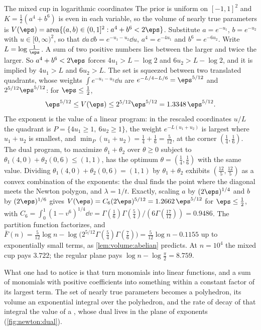 \begin{refsection}
\begin{computation}{The mixed cup in logarithmic coordinates}\label{comp:newton:emblem}
\step The prior is uniform on $[-1,1]^2$ and $K=\frac12(a^4+b^6)$ is even in each variable, so the volume of nearly true parameters is $V(\eps)=\mathrm{area}\{(a,b)\in(0,1]^2:a^4+b^6<2\eps\}$.
\step Substitute $a=e^{-u_1}$, $b=e^{-u_2}$ with $u\in[0,\infty)^2$, so that $\dd a\,\dd b=e^{-u_1-u_2}\dd u$, $a^4=e^{-4u_1}$ and $b^6=e^{-6u_2}$. Write $L=\log\frac1\eps$.
\step A sum of two positive numbers lies between the larger and twice the larger. So $a^4+b^6<2\eps$ forces $4u_1>L-\log2$ and $6u_2>L-\log2$, and it is implied by $4u_1>L$ and $6u_2>L$. The set is squeezed between two translated quadrants, whose weights $\int e^{-u_1-u_2}\dd u$ are $e^{-L/4-L/6}=\eps^{5/12}$ and $2^{5/12}\eps^{5/12}$: for $\eps\le\frac12$,
\[
\eps^{5/12}\le V(\eps)\le2^{5/12}\eps^{5/12}=1.3348\,\eps^{5/12}.
\]
\step The exponent is the value of a linear program: in the rescaled coordinates $u/L$ the quadrant is $P=\{4u_1\ge1,\ 6u_2\ge1\}$, the weight $e^{-L(u_1+u_2)}$ is largest where $u_1+u_2$ is smallest, and $\min_P(u_1+u_2)=\frac14+\frac16=\frac5{12}$, at the corner $(\frac14,\frac16)$.
\step The dual program, to maximize $\theta_1+\theta_2$ over $\theta\ge0$ subject to $\theta_1(4,0)+\theta_2(0,6)\le(1,1)$, has the optimum $\theta=(\frac14,\frac16)$ with the same value. Dividing $\theta_1(4,0)+\theta_2(0,6)=(1,1)$ by $\theta_1+\theta_2$ exhibits $(\frac{12}5,\frac{12}5)$ as a convex combination of the exponents: the dual finds the point where the diagonal meets the Newton polygon, and $\lambda=1/t$.
\step Exactly, scaling $a$ by $(2\eps)^{1/4}$ and $b$ by $(2\eps)^{1/6}$ gives $V(\eps)=C_6(2\eps)^{5/12}=1.2662\,\eps^{5/12}$ for $\eps\le\frac12$, with $C_6=\int_0^1(1-v^6)^{1/4}\dd v=\Gamma(\frac16)\Gamma(\frac54)/(6\Gamma(\frac{17}{12}))=0.9486$. The partition function factorizes, and $\bar F(n)=\frac5{12}\log n-\log\bigl(2^{5/12}\Gamma(\frac54)\Gamma(\frac76)\bigr)=\frac5{12}\log n-0.1155$ up to exponentially small terms, as \cref{lem:volume:abelian} predicts. At $n=10^4$ the mixed cup pays $3.722$; the regular plane pays $\log n-\log\frac\pi2=8.759$.
\end{computation}

What one had to notice is that  turn monomials into linear functions, and a sum of monomials with positive coefficients into something within a constant factor of its largest term. The set of nearly true parameters becomes a polyhedron, its volume an exponential integral over the polyhedron, and the rate of decay of that integral the value of a , whose dual lives in the plane of exponents (\cref{fig:newton:dual}).


\end{refsection}
